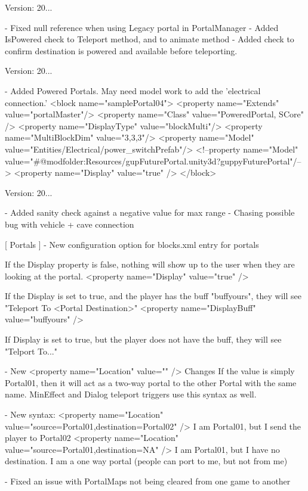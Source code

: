 Version\+: 20... \begin{DoxyVerb}[ Portals ]
    - Fixed null reference when using Legacy portal in PortalManager
    - Added IsPowered check to Teleport method, and to animate method
    - Added check to confirm destination is powered and available before teleporting.
\end{DoxyVerb}
 Version\+: 20... \begin{DoxyVerb}[ Portals ]
    - Added Powered Portals. May need model work to add the 'electrical connection.'
        <block name="samplePortal04">
            <property name="Extends" value="portalMaster"/>
            <property name="Class" value="PoweredPortal, SCore" />
            <property name="DisplayType" value="blockMulti"/>
            <property name="MultiBlockDim" value="3,3,3"/>
            <property name="Model" value="Entities/Electrical/power_switchPrefab"/>
            <!--property name="Model" value="#@modfolder:Resources/gupFuturePortal.unity3d?guppyFuturePortal"/-->
            <property name="Display" value="true" />
        </block>
\end{DoxyVerb}
 Version\+: 20... \begin{DoxyVerb}[ Caves ]
    - Added sanity check against a negative value for max range - Chasing possible bug with vehicle + cave connection

[ Portals ]
    - New configuration option for blocks.xml entry for portals

        If the Display property is false, nothing will show up to the user when they are looking at the portal.
        <property name="Display" value="true" /> 

        If the Display is set to true, and the player has the buff "buffyours", they will see "Teleport To <Portal Destination>"
        <property name="DisplayBuff" value="buffyours" />

        If Display is set to true, but the player does not have the buff, they will see "Telport To..."

    - New <property name="Location" value="" /> Changes
        If the value is simply Portal01, then it will act as a two-way portal to the other Portal with the same name.
        MinEffect and Dialog teleport triggers use this syntax as well.

        - New syntax:
            <property name="Location" value="source=Portal01,destination=Portal02" />  I am Portal01, but I send the player to Portal02
            <property name="Location" value="source=Portal01,destination=NA" />  I am Portal01, but I have no destination. I am a one way portal (people can port to me, but not from me)

    - Fixed an issue with PortalMaps not being cleared from one game to another
\end{DoxyVerb}
